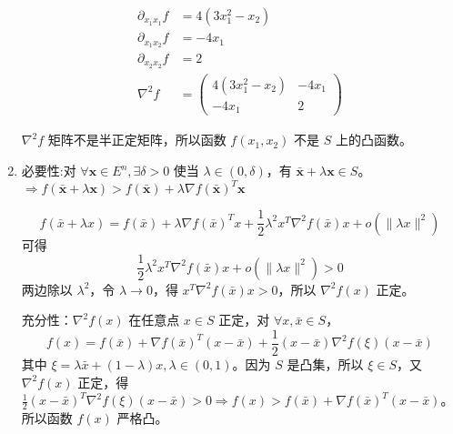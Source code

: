 \begin{solution}
\begin{enumerate}
            \begin{align*}
                \partial_{x_1x_1}f &= 4(3x_1^2 - x_2)\\
                \partial_{x_1x_2}f &= -4x_1 \\
                \partial_{x_2x_2}f &= 2\\
                \nabla^2 f &= \begin{pmatrix}
                    4(3x_1^2 - x_2) & -4x_1 \\
                    -4x_1 & 2
                \end{pmatrix} 
            \end{align*}
            
            $\nabla^2 f$ 矩阵不是半正定矩阵，所以函数 $f(x_1, x_2)$ 不是 $S$ 上的凸函数。
        
        \item 必要性:对 $\forall \boldsymbol{x} \in E^n,\exists \delta > 0$ 使当 $\lambda \in (0, \delta)$，有 $\bar{\boldsymbol{x}} + \lambda \boldsymbol{x} \in S$。
        $\Rightarrow f(\bar{\boldsymbol{x}} + \lambda\boldsymbol{x}) > f(\bar{\boldsymbol{x}}) + \lambda \nabla f(\bar{\boldsymbol{x}})^T\boldsymbol{x}$

        \[f(\bar{x} + \lambda x) = f(\bar{x}) + \lambda\nabla f(\bar{x})^T x + \frac{1}{2}\lambda^2x^T\nabla^2f(\bar{x})x + o(\|\lambda x\|^2)\]
        可得\[\frac{1}{2}\lambda^2x^T\nabla^2f(\bar{x})x + o(\|\lambda x\|^2) > 0\]
        两边除以 $\lambda^2$，令 $\lambda\to 0$，得 $x^T\nabla^2f(\bar{x})x > 0$，所以 $\nabla^2f(x)$ 正定。

        充分性：$\nabla^2f(x)$ 在任意点 $x\in S$ 正定，对 $\forall x, \bar{x} \in S$，\[f(x) = f(\bar{x}) + \nabla f(\bar{x})^T(x - \bar{x}) + \frac{1}{2}(x - \bar{x})\nabla^2 f(\xi)(x - \bar{x})\]
        其中 $\xi = \lambda\bar{x} + (1 - \lambda)x, \lambda \in (0, 1)$。因为 $S$ 是凸集，所以 $\xi \in S$，又 $\nabla^2f(x)$ 正定，得 $\frac{1}{2}(x - \bar{x})^T\nabla^2 f(\xi)(x - \bar{x}) > 0\Rightarrow f(x) > f(\bar{x}) + \nabla f(\bar{x})^T(x - \bar{x})$。所以函数 $f(x)$ 严格凸。
    \end{enumerate}
\end{solution}

